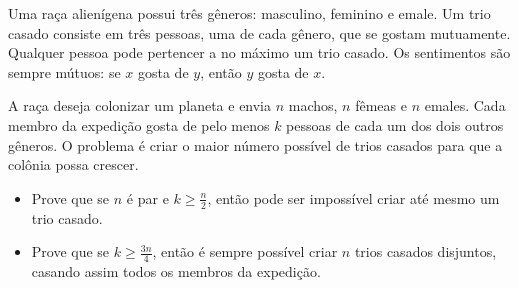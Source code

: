 Uma raça alienígena possui três gêneros: masculino, feminino e emale. Um trio casado consiste em três pessoas, uma de cada gênero, que se gostam mutuamente. Qualquer pessoa pode pertencer a no máximo um trio casado. Os sentimentos são sempre mútuos: se \(x\) gosta de \(y\), então \(y\) gosta de \(x\).

A raça deseja colonizar um planeta e envia \(n\) machos, \(n\) fêmeas e \(n\) emales. Cada membro da expedição gosta de pelo menos \(k\) pessoas de cada um dos dois outros gêneros. O problema é criar o maior número possível de trios casados para que a colônia possa crescer.

\begin{itemize}
\item[(a)] Prove que se \(n\) é par e \(k \geq \frac{n}{2}\), então pode ser impossível criar até mesmo um trio casado.
\item[(b)] Prove que se \(k \geq \frac{3n}{4}\), então é sempre possível criar \(n\) trios casados disjuntos, casando assim todos os membros da expedição.
\end{itemize}
